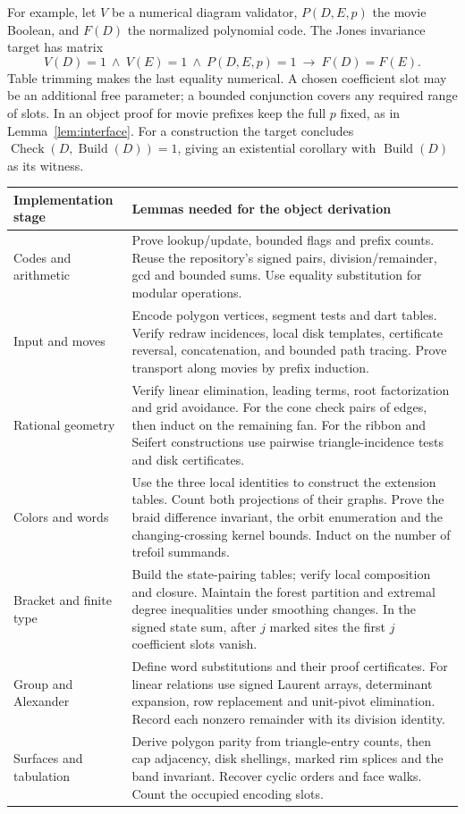 For example, let $V$ be a numerical diagram validator, $P(D,E,p)$ the movie Boolean, and $F(D)$ the normalized polynomial code. The Jones invariance target has matrix
\[
 V(D)=1\ \land\ V(E)=1\ \land\ P(D,E,p)=1
      \ \longrightarrow\ F(D)=F(E).
\]
Table trimming makes the last equality numerical. A chosen coefficient slot may be an additional free parameter; a bounded conjunction covers any required range of slots. In an object proof for movie prefixes keep the full $p$ fixed, as in Lemma~\ref{lem:interface}. For a construction the target concludes $\operatorname{Check}(D,\operatorname{Build}(D))=1$, giving an existential corollary with $\operatorname{Build}(D)$ as its witness.

\begin{center}\small
\renewcommand{\arraystretch}{1.19}
\begin{tabularx}{\linewidth}{@{}p{.21\linewidth}X@{}}
\toprule Implementation stage & Lemmas needed for the object derivation\\\midrule
Codes and arithmetic & Prove lookup/update, bounded flags and prefix counts. Reuse the repository's signed pairs, division/remainder, gcd and bounded sums. Use equality substitution for modular operations.\\
Input and moves & Encode polygon vertices, segment tests and dart tables. Verify redraw incidences, local disk templates, certificate reversal, concatenation, and bounded path tracing. Prove transport along movies by prefix induction.\\
Rational geometry & Verify linear elimination, leading terms, root factorization and grid avoidance. For the cone check pairs of edges, then induct on the remaining fan. For the ribbon and Seifert constructions use pairwise triangle-incidence tests and disk certificates.\\
Colors and words & Use the three local identities to construct the extension tables. Count both projections of their graphs. Prove the braid difference invariant, the orbit enumeration and the changing-crossing kernel bounds. Induct on the number of trefoil summands.\\
Bracket and finite type & Build the state-pairing tables; verify local composition and closure. Maintain the forest partition and extremal degree inequalities under smoothing changes. In the signed state sum, after $j$ marked sites the first $j$ coefficient slots vanish.\\
Group and Alexander & Define word substitutions and their proof certificates. For linear relations use signed Laurent arrays, determinant expansion, row replacement and unit-pivot elimination. Record each nonzero remainder with its division identity.\\
Surfaces and tabulation & Derive polygon parity from triangle-entry counts, then cap adjacency, disk shellings, marked rim splices and the band invariant. Recover cyclic orders and face walks. Count the occupied encoding slots.\\\bottomrule
\end{tabularx}
\end{center}


